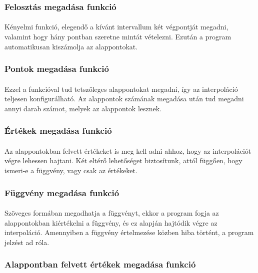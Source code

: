 \documentclass[12pt]{report}
\begin{document}
\subsubsection{Felosztás megadása funkció}
\paragraph{}
Kényelmi funkció, elegendő a kívánt intervallum két végpontját megadni, valamint hogy hány pontban szeretne mintát vételezni. Ezután a program automatikusan kiszámolja az alappontokat.

\subsubsection{Pontok megadása funkció}
\paragraph{}
Ezzel a funkcióval tud tetszőleges alappontokat megadni, így az interpoláció teljesen konfigurálható. Az alappontok számának megadása után tud megadni annyi darab számot, melyek az alappontok lesznek.

\subsubsection{Értékek megadása funkció}
\paragraph{}
Az alappontokban felvett értékeket is meg kell adni ahhoz, hogy az interpolációt végre lehessen hajtani. Két eltérő lehetőséget biztosítunk, attól függően, hogy ismeri-e a függvény, vagy csak az értékeket.

\subsubsection{Függvény megadása funkció}
\paragraph{}
Szöveges formában megadhatja a függvényt, ekkor a program fogja az alappontokban kiértékelni a függvény, és ez alapján hajtódik végre az interpoláció. Amennyiben a függvény értelmezése közben hiba történt, a program jelzést ad róla.

\subsubsection{Alappontban felvett értékek megadása funkció}
\end{document}
